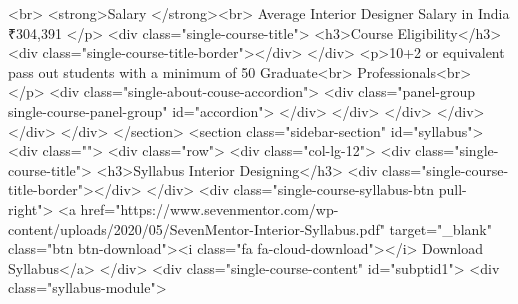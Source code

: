 {<br>
<strong>Salary
</strong><br>
Average Interior Designer Salary in India
₹304,391
</p>
<div class="single-course-title">
<h3>Course Eligibility</h3>
<div class="single-course-title-border"></div>
</div>
<p>10+2 or equivalent pass out students with a minimum of 50%
Graduate<br>
Professionals<br>
</p>
<div class="single-about-couse-accordion">
<div class="panel-group single-course-panel-group" id="accordion">
</div>
</div>
</div>
</div>
</div>
</div>
</section>
<section class="sidebar-section" id="syllabus">
<div class="">
<div class="row">
<div class="col-lg-12">
<div class="single-course-title">
<h3>Syllabus Interior Designing</h3>
<div class="single-course-title-border"></div>
</div>
<div class="single-course-syllabus-btn pull-right">
<a href="https://www.sevenmentor.com/wp-content/uploads/2020/05/SevenMentor-Interior-Syllabus.pdf" target="_blank" class="btn btn-download"><i class="fa fa-cloud-download"></i> Download Syllabus</a>
</div>
<div class="single-course-content" id="subptid1">
<div class="syllabus-module">

}
